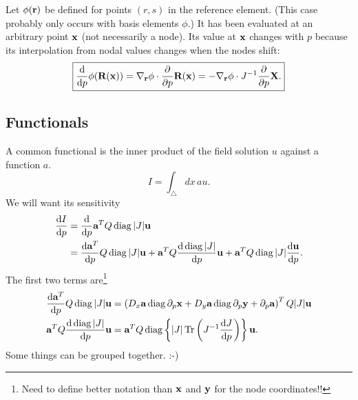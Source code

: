 Let $\phi(\textbf{r})$ be defined for points $(r,s)$ in the reference element.  (This case probably only occurs with basis elements $\phi$.)  It has been evaluated at an arbitrary point $\textbf{x}$ (not necessarily a node).  Its value at $\textbf{x}$ changes with $p$ because its interpolation from nodal values changes when the nodes shift:
%
\begin{equation}
\boxed{
\frac{\mathrm{d}{}}{\mathrm{d}{p}} \phi(\textbf{R}(\textbf{x})) = \nabla_{\textbf{r}} \phi \cdot \frac{\partial{}}{\partial{p}} \textbf{R}(\textbf{x}) = -\nabla_{\textbf{r}} \phi \cdot J^{-1} \frac{\partial{}}{\partial{p}} \textbf{X}.
}
\end{equation}

\subsection{Functionals}

A common functional is the inner product of the field solution $u$ against a function $a$.
%
\begin{equation}
I = \int_\bigtriangleup dx \, a u.
\end{equation}
%
We will want its sensitivity
%
\begin{equation}
\begin{aligned}
\frac{\mathrm{d}{I}}{\mathrm{d}{p}} &= \frac{\mathrm{d}{}}{\mathrm{d}{p}} \textbf{a}^T Q \operatorname{diag} |J| \textbf{u} \\
&= \frac{\mathrm{d}{\textbf{a}^T}}{\mathrm{d}{p}} Q \operatorname{diag} |J| \textbf{u} +
\textbf{a}^T Q \frac{\mathrm{d}{\, \operatorname{diag} |J|}}{\mathrm{d}{p}} \textbf{u} +
\textbf{a}^T Q \operatorname{diag} |J| \frac{\mathrm{d}{\textbf{u}}}{\mathrm{d}{p}}.
\end{aligned}
\label{eqn:discreteFunctionalSensitivity}
\end{equation}
%
The first two terms are\footnote{Need to define better notation than $\textbf{x}$ and $\textbf{y}$ for the node coordinates!!}
%
\begin{equation}
\begin{aligned}
\frac{\mathrm{d}{\textbf{a}^T}}{\mathrm{d}{p}} Q \operatorname{diag}|J| \textbf{u} &=
\left( D_x \textbf{a} \operatorname{diag} \partial_p \textbf{x} + D_y \textbf{a} \operatorname{diag} \partial_p \textbf{y} + \partial_p \textbf{a} \right)^T Q |J| \textbf{u} \\
\textbf{a}^T Q \frac{\mathrm{d}{\, \operatorname{diag} |J|}}{\mathrm{d}{p}} \textbf{u} &= \textbf{a}^T Q \operatorname{diag} \left\{ |J| \operatorname{Tr} \left( J^{-1} \frac{\mathrm{d}{J}}{\mathrm{d}{p}} \right) \right\} \textbf{u}.
\end{aligned}
\end{equation}
%
Some things can be grouped together.  :-)





